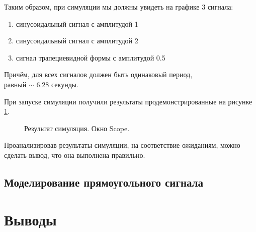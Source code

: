 \documentclass[a4paper,14pt]{extarticle}
\begin{document}
Таким образом, при симуляции мы должны увидеть на графике 3 сигнала:
\begin{enumerate}
\item синусоидальный сигнал с амплитудой 1
\item синусоидальный сигнал с амплитудой 2
\item сигнал трапециевидной формы с амплитудой 0.5
\end{enumerate}

Причём, для всех сигналов должен быть одинаковый период,\\ равный 
$\sim$ 6.28 секунды.\\

\newpage

При запуске симуляции получили результаты продемонстрированные на рисунке \ref{002}.

\begin{figure}[H]
\caption{Результат симуляция. Окно Scope.}
\label{002}
\end{figure}

Проанализировав результаты симуляции, на соответствие ожиданиям, можно сделать вывод, что она выполнена правильно.

\subsection{Моделирование прямоугольного сигнала}



\section{Выводы}
\end{document}
